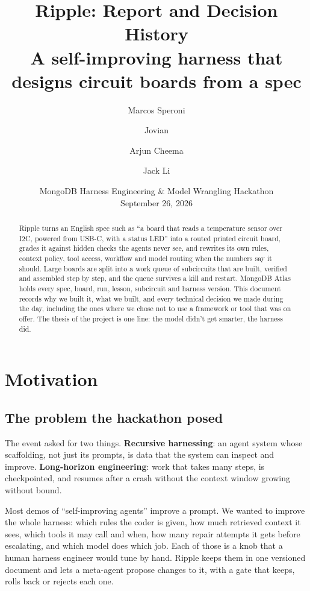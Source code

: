 \documentclass[11pt,a4paper]{article}
\title{Ripple: Report and Decision History\\
\large A self-improving harness that designs circuit boards from a spec}
\author{Marcos Speroni \and Jovian \and Arjun Cheema \and Jack Li}
\date{MongoDB Harness Engineering \& Model Wrangling Hackathon \\ September 26, 2026}
\begin{document}
\maketitle

\begin{abstract}
Ripple turns an English spec such as ``a board that reads a temperature sensor over I2C, powered from USB-C, with a status LED'' into a routed printed circuit board, grades it against hidden checks the agents never see, and rewrites its own rules, context policy, tool access, workflow and model routing when the numbers say it should. Large boards are split into a work queue of subcircuits that are built, verified and assembled step by step, and the queue survives a kill and restart. MongoDB Atlas holds every spec, board, run, lesson, subcircuit and harness version. This document records why we built it, what we built, and every technical decision we made during the day, including the ones where we chose not to use a framework or tool that was on offer. The thesis of the project is one line: the model didn't get smarter, the harness did.
\end{abstract}

\tableofcontents

\section{Motivation}

\subsection{The problem the hackathon posed}

The event asked for two things. \textbf{Recursive harnessing}: an agent system whose scaffolding, not just its prompts, is data that the system can inspect and improve. \textbf{Long-horizon engineering}: work that takes many steps, is checkpointed, and resumes after a crash without the context window growing without bound.

Most demos of ``self-improving agents'' improve a prompt. We wanted to improve the whole harness: which rules the coder is given, how much retrieved context it sees, which tools it may call and when, how many repair attempts it gets before escalating, and which model does which job. Each of those is a knob that a human harness engineer would tune by hand. Ripple keeps them in one versioned document and lets a meta-agent propose changes to it, with a gate that keeps, rolls back or rejects each one.
\end{document}
